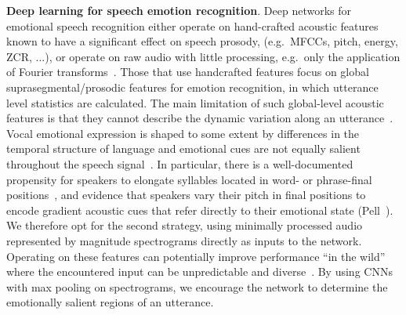 \documentclass[sigconf]{acmart}
\begin{document}
\noindent \textbf{Deep learning for speech emotion recognition}.
Deep networks for emotional speech recognition either operate on hand-crafted acoustic features known to have a significant effect on speech prosody, (e.g.\  MFCCs, pitch, energy, ZCR, ...), or operate on raw audio with little processing, e.g.\  only the application of Fourier transforms~\cite{cummins2017image}. 
Those that use handcrafted features focus on global suprasegmental/prosodic features for emotion recognition, in which utterance level statistics are calculated. The main limitation of such global-level acoustic features is that they cannot describe the dynamic variation along an utterance~\cite{aldeneh2017using}. Vocal emotional expression is shaped to some extent by differences in the temporal structure of language and emotional cues are not equally salient throughout the speech signal~\cite{rigoulot2014emotion,kim2016emotion}.
In particular,  there is a well-documented propensity for speakers to elongate syllables located in word- or phrase-final positions~\cite{oller1973effect,pell2001influence}, and evidence that speakers vary their pitch in final positions to encode gradient acoustic cues that refer directly to their emotional state (Pell~\cite{pell2001influence}).  
We therefore opt for the second strategy, using minimally processed audio represented by magnitude
spectrograms directly as inputs to the network. Operating on these features can potentially improve performance ``in the wild'' where the encountered input can be unpredictable and diverse~\cite{kim2017deep}. By using CNNs with max pooling on spectrograms, we encourage the network to determine the emotionally salient regions of an utterance.
\end{document}
